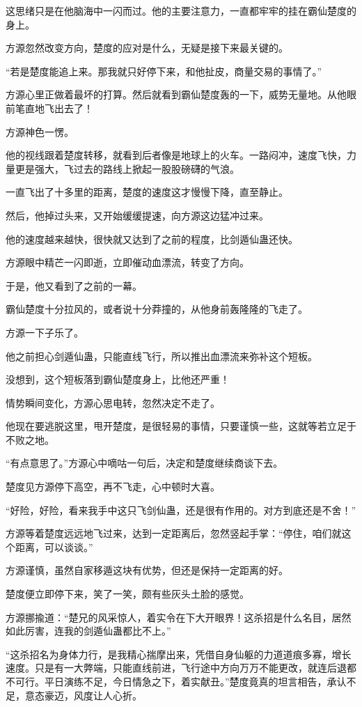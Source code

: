 \begin{this_body}
这思绪只是在他脑海中一闪而过。他的主要注意力，一直都牢牢的挂在霸仙楚度的身上。

方源忽然改变方向，楚度的应对是什么，无疑是接下来最关键的。

“若是楚度能追上来。那我就只好停下来，和他扯皮，商量交易的事情了。”

方源心里正做着最坏的打算。然后就看到霸仙楚度轰的一下，威势无量地。从他眼前笔直地飞出去了！

方源神色一愣。

他的视线跟着楚度转移，就看到后者像是地球上的火车。一路闷冲，速度飞快，力量更是强大，飞过去的路线上掀起一股股磅礴的气浪。

一直飞出了十多里的距离，楚度的速度这才慢慢下降，直至静止。

然后，他掉过头来，又开始缓缓提速，向方源这边猛冲过来。

他的速度越来越快，很快就又达到了之前的程度，比剑遁仙蛊还快。

方源眼中精芒一闪即逝，立即催动血漂流，转变了方向。

于是，他又看到了之前的一幕。

霸仙楚度十分拉风的，或者说十分莽撞的，从他身前轰隆隆的飞走了。

方源一下子乐了。

他之前担心剑遁仙蛊，只能直线飞行，所以推出血漂流来弥补这个短板。

没想到，这个短板落到霸仙楚度身上，比他还严重！

情势瞬间变化，方源心思电转，忽然决定不走了。

他现在要逃脱这里，甩开楚度，是很轻易的事情，只要谨慎一些，这就等若立足于不败之地。

“有点意思了。”方源心中嘀咕一句后，决定和楚度继续商谈下去。

楚度见方源停下高空，再不飞走，心中顿时大喜。

“好险，好险，看来我手中这只飞剑仙蛊，还是很有作用的。对方到底还是不舍！”

方源等着楚度远远地飞过来，达到一定距离后，忽然竖起手掌：“停住，咱们就这个距离，可以谈谈。”

方源谨慎，虽然自家移遁这块有优势，但还是保持一定距离的好。

楚度便立即停下来，笑了一笑，颇有些灰头土脸的感觉。

方源挪揄道：“楚兄的风采惊人，着实令在下大开眼界！这杀招是什么名目，居然如此厉害，连我的剑遁仙蛊都比不上。”

“这杀招名为身体力行，是我精心揣摩出来，凭借自身仙躯的力道道痕多寡，增长速度。只是有一大弊端，只能直线前进，飞行途中方向万万不能更改，就连后退都不可行。平日演练不足，今日情急之下，着实献丑。”楚度竟真的坦言相告，承认不足，意态豪迈，风度让人心折。


\end{this_body}
